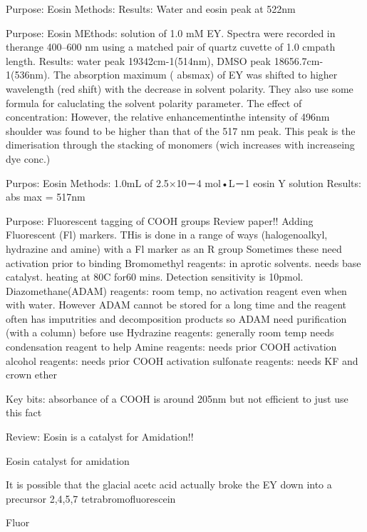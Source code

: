 \cite{abbas2022studying}
Purpose: Eosin
Methods:
Results: Water and eosin peak at 522nm


\cite{chakraborty2011spectral}
Purpose: Eosin
MEthods: solution of 1.0 mM EY.  Spectra were recorded in therange 400–600 nm using a matched pair of quartz cuvette of 1.0 cmpath length.
Results: water peak 19342cm-1(514nm), DMSO peak 18656.7cm-1(536nm). The absorption maximum ( absmax) of EY was shifted to higher wavelength (red shift) with the decrease in solvent polarity. They also use some formula for caluclating the solvent polarity parameter. The effect of concentration: However, the relative enhancementinthe intensity of 496nm shoulder was found to be higher than that of the 517 nm peak. This peak is the dimerisation through the stacking of monomers (wich increases with increaseing dye conc.)

\cite{yu2009fading}
Purpos: Eosin
Methods: 1.0mL of 2.5×10－4 mol•L－1 eosin Y solution
Results: abs max = 517nm


\cite{toyo2002fluorescent}
Purpose: Fluorescent tagging of COOH groups
Review paper!!
Adding Fluorescent (Fl) markers. THis is done in a range of ways (halogenoalkyl, hydrazine and amine) with a Fl marker as an R group Sometimes these need activation prior to binding 
Bromomethyl reagents: in aprotic solvents. needs base catalyst. heating at 80C for60 mins. Detection sensitivity is 10pmol.
Diazomethane(ADAM) reagents: room temp, no activation reagent even when with water. However ADAM cannot be stored for a long time and the reagent often has imputrities and decomposition products so ADAM need purification (with a column) before use
Hydrazine reagents: generally room temp needs condensation reagent to help
Amine reagents: needs prior COOH activation
alcohol reagents: needs prior COOH activation
sulfonate reagents: needs KF and crown ether


Key bits: absorbance of a COOH is around 205nm but not efficient to just use this fact



\cite{hussein2025recent}
Review: Eosin is a catalyst for Amidation!!

\cite{srivastava2019visible}
Eosin catalyst for amidation

\cite{lin1991eosin}
It is possible that the glacial acetc acid actually broke the EY down into a precursor 2,4,5,7 tetrabromofluorescein


\cite{slyusareva2012effect}
Fluor

\cite{yoshimura1955mechanism}

